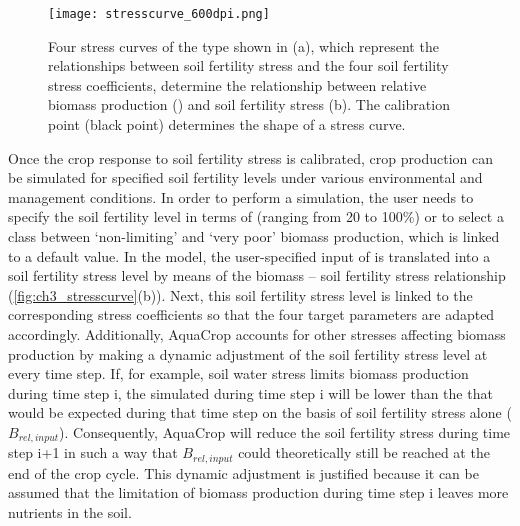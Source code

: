 \begin{figure}[tbhp]
	\centering
		\texttt{[image: stresscurve\_600dpi.png]}
	\caption{Four stress curves of the type shown in (a), which represent the relationships between soil fertility stress and the four soil fertility stress coefficients, determine the relationship between relative biomass production (\Brel) and soil fertility stress (b). The calibration point (black point) determines the shape of a stress curve.}
	\label{fig:ch3_stresscurve}
\end{figure}

Once the crop response to soil fertility stress is calibrated, crop production can be simulated for specified soil fertility levels under various environmental and management conditions. In order to perform a simulation, the user needs to specify the soil fertility level in terms of \Brel (ranging from 20 to 100\%) or to select a class between `non-limiting' and `very poor' biomass production, which is linked to a default \Brel value. In the model, the user-specified input of \Brel is translated into a soil fertility stress level by means of the biomass – soil fertility stress relationship (\autoref{fig:ch3_stresscurve}(b)). Next, this soil fertility stress level is linked to the corresponding stress coefficients so that the four target parameters are adapted accordingly. Additionally, AquaCrop accounts for other stresses affecting biomass production by making a dynamic adjustment of the soil fertility stress level at every time step. If, for example, soil water stress limits biomass production during time step i, the simulated \Brel during time step i will be lower than the \Brel that would be expected during that time step on the basis of soil fertility stress alone ($B_{rel,input}$). Consequently, AquaCrop will reduce the soil fertility stress during time step i+1 in such a way that $B_{rel,input}$ could theoretically still be reached at the end of the crop cycle. This dynamic adjustment is justified because it can be assumed that the limitation of biomass production during time step i leaves more nutrients in the soil.

